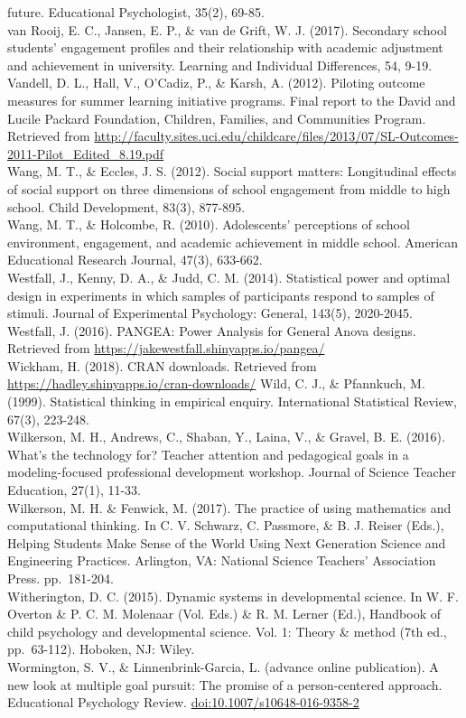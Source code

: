 \documentclass[]{msu-thesis}
\theoremstyle{definition}
\theoremstyle{definition}
\theoremstyle{definition}
\theoremstyle{remark}
\begin{document}
future. Educational Psychologist, 35(2), 69-85.\\
van Rooij, E. C., Jansen, E. P., \& van de Grift, W. J. (2017).
Secondary school students' engagement profiles and their relationship
with academic adjustment and achievement in university. Learning and
Individual Differences, 54, 9-19.\\
Vandell, D. L., Hall, V., O'Cadiz, P., \& Karsh, A. (2012). Piloting
outcome measures for summer learning initiative programs. Final report
to the David and Lucile Packard Foundation, Children, Families, and
Communities Program. Retrieved from
\url{http://faculty.sites.uci.edu/childcare/files/2013/07/SL-Outcomes-2011-Pilot_Edited_8.19.pdf}\\
Wang, M. T., \& Eccles, J. S. (2012). Social support matters:
Longitudinal effects of social support on three dimensions of school
engagement from middle to high school. Child Development, 83(3),
877-895.\\
Wang, M. T., \& Holcombe, R. (2010). Adolescents' perceptions of school
environment, engagement, and academic achievement in middle school.
American Educational Research Journal, 47(3), 633-662.\\
Westfall, J., Kenny, D. A., \& Judd, C. M. (2014). Statistical power and
optimal design in experiments in which samples of participants respond
to samples of stimuli. Journal of Experimental Psychology: General,
143(5), 2020-2045.\\
Westfall, J. (2016). PANGEA: Power Analysis for General Anova designs.
Retrieved from \url{https://jakewestfall.shinyapps.io/pangea/}\\
Wickham, H. (2018). CRAN downloads. Retrieved from
\url{https://hadley.shinyapps.io/cran-downloads/} Wild, C. J., \&
Pfannkuch, M. (1999). Statistical thinking in empirical enquiry.
International Statistical Review, 67(3), 223-248.\\
Wilkerson, M. H., Andrews, C., Shaban, Y., Laina, V., \& Gravel, B. E.
(2016). What's the technology for? Teacher attention and pedagogical
goals in a modeling-focused professional development workshop. Journal
of Science Teacher Education, 27(1), 11-33.\\
Wilkerson, M. H. \& Fenwick, M. (2017). The practice of using
mathematics and computational thinking. In C. V. Schwarz, C. Passmore,
\& B. J. Reiser (Eds.), Helping Students Make Sense of the World Using
Next Generation Science and Engineering Practices. Arlington, VA:
National Science Teachers' Association Press. pp.~181-204.\\
Witherington, D. C. (2015). Dynamic systems in developmental science. In
W. F. Overton \& P. C. M. Molenaar (Vol. Eds.) \& R. M. Lerner (Ed.),
Handbook of child psychology and developmental science. Vol. 1: Theory
\& method (7th ed., pp.~63-112). Hoboken, NJ: Wiley.\\
Wormington, S. V., \& Linnenbrink-Garcia, L. (advance online
publication). A new look at multiple goal pursuit: The promise of a
person-centered approach. Educational Psychology Review.
\url{doi:10.1007/s10648-016-9358-2}


\end{document}
